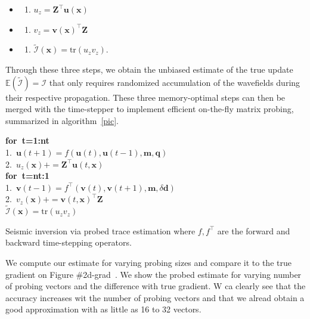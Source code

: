\documentclass[]{segabs}
\begin{document}
\begin{itemize}
\item
  \begin{enumerate}
  \def\labelenumi{\arabic{enumi}.}
  \itemsep1pt\parskip0pt
  \item
    $u_z = \mathbf{Z}^\top \mathbf{u}(\mathbf{x})$
  \end{enumerate}
\item
  \begin{enumerate}
  \def\labelenumi{\arabic{enumi}.}
  \itemsep1pt\parskip0pt
  \item
    $v_z = \mathbf{v}(\mathbf{x})^\top \mathbf{Z} $
  \end{enumerate}
\item
  \begin{enumerate}
  \def\labelenumi{\arabic{enumi}.}
  \setcounter{enumi}{2}
  \itemsep1pt\parskip0pt
  \item
    $\tilde{\mathcal{I}}(\mathbf{x}) = \text{tr}(u_z v_z)$.
  \end{enumerate}
\end{itemize}

Through these three steps, we obtain the unbiased \citep{hutchpp}
estimate of the true update
$\mathbb{E}(\tilde{\mathcal{I}}) = \mathcal{I}$ that only requires
randomized accumulation of the wavefields during their respective
propagation. These three memory-optimal steps can then be merged with
the time-stepper to implement efficient on-the-fly matrix probing,
summarized in algorithm~\ref{pic}.

\begin{scholmdAlgorithm}
\textbf{for~t=1:nt}\\1.~$\mathbf{u}(t+1) = f(\mathbf{u}(t), \mathbf{u}(t-1), \mathbf{m}, \mathbf{q})$\\2.~$u_z(\mathbf{x}) += \mathbf{Z}^\top \mathbf{u}(t, \mathbf{x})$\\\textbf{for~t=nt:1}\\1.~$\mathbf{v}(t-1) = f^\top(\mathbf{v}(t), \mathbf{v}(t+1), \mathbf{m}, \delta \mathbf{d})$\\2.~$v_z(\mathbf{x}) += \mathbf{v}(t, \mathbf{x})^\top \mathbf{Z}$\\$\tilde{\mathcal{I}}(\mathbf{x}) = \text{tr}(u_z v_z)$
\caption{Seismic inversion via probed trace estimation where $f, f^\top$
are the forward and backward time-stepping operators.}\label{pic}
\end{scholmdAlgorithm}

We compute our estimate for varying probing sizes and compare it to the
true gradient on Figure \#2d-grad~. We show the probed estimate for
varying number of probing vectors and the difference with true gradient.
W ca clearly see that the accuracy increases wit the number of probing
vectors and that we alread obtain a good approximation with as little as
16 to 32 vectors.
\end{document}
